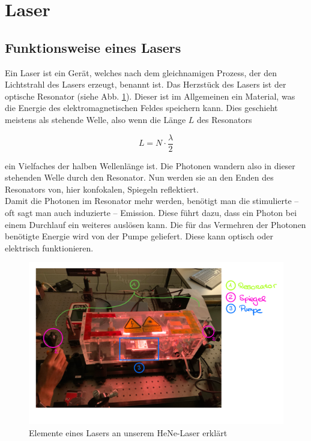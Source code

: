 \section{Laser}
\subsection{Funktionsweise eines Lasers}

Ein Laser ist ein Gerät, welches nach dem gleichnamigen Prozess, der den Lichtstrahl des Lasers erzeugt, benannt ist. Das Herzstück des 
Lasers ist der optische Resonator (siehe Abb. \ref{bild:LaserAufbau}). Dieser ist im Allgemeinen ein Material, was die Energie des elektromagnetischen Feldes speichern kann. Dies 
geschieht meistens als stehende Welle, also wenn die Länge $L$ des Resonators 

\begin{equation*}
    L = N\cdot\frac{\lambda}{2}
\end{equation*}

ein Vielfaches der halben Wellenlänge ist. Die Photonen wandern also in dieser stehenden Welle durch den Resonator. Nun werden sie an den Enden
des Resonators von, hier konfokalen, Spiegeln reflektiert. \\
Damit die Photonen im Resonator mehr werden, benötigt man die stimulierte – oft sagt man auch induzierte – Emission. Diese führt dazu, dass ein Photon 
bei einem Durchlauf ein weiteres auslösen kann. Die für das Vermehren der Photonen benötigte Energie wird von der Pumpe geliefert. Diese kann optisch 
oder elektrisch funktionieren.\\

\begin{figure}[ht]
    \centering
    \includegraphics[width = 14cm]{Bilder/Auswertung/LaserAufbau.png}
    \caption{Elemente eines Lasers an unserem HeNe-Laser erklärt}
    \label{bild:LaserAufbau}
\end{figure}

